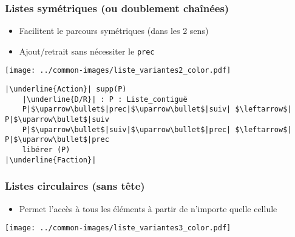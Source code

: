 \documentclass[table,handout,tikz,12pt,svgnames]{beamer}
\begin{document}
\begin{frame}[fragile=singleslide]
	\frametitle{Listes symétriques \large (ou doublement chaînées)}
	\begin{block}{}
		\begin{itemize}
			\item Facilitent le parcours symétriques (dans les 2 sens)
			\item Ajout/retrait sans nécessiter le \texttt{prec}
		\end{itemize}
		\vspace{-2em}
		\begin{center}
			{\texttt{[image: ../common-images/liste\_variantes2\_color.pdf]}}
		\end{center}
	\end{block}
	\vspace{-1cm}
	\begin{block}{}
		\begin{verbatim}
|\underline{Action}| supp(P)
	|\underline{D/R}| : P : Liste_contiguë
	P|$\uparrow\bullet$|prec|$\uparrow\bullet$|suiv| $\leftarrow$| P|$\uparrow\bullet$|suiv
	P|$\uparrow\bullet$|suiv|$\uparrow\bullet$|prec| $\leftarrow$| P|$\uparrow\bullet$|prec
	libérer (P)
|\underline{Faction}|
		\end{verbatim}
	\end{block}
\end{frame}


\begin{frame}[fragile=singleslide]
	\frametitle{Listes circulaires (sans tête)}
	\begin{block}{}
		\begin{itemize}
			\item Permet l'accès à tous les éléments à partir de n'importe quelle cellule
		\end{itemize}
	\end{block}
	\begin{center}
		\hspace{-1.5cm}
		{\texttt{[image: ../common-images/liste\_variantes3\_color.pdf]}}
	\end{center}
\end{frame}
\end{document}
